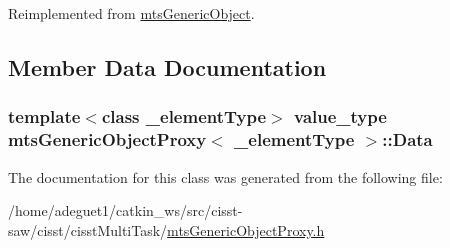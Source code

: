 Reimplemented from \hyperlink{classmts_generic_object_a4916a6c62ee5b167d7c93c88ab72523a}{mts\-Generic\-Object}.



\subsection{Member Data Documentation}
\hypertarget{classmts_generic_object_proxy_a577e49255c24db1f0573c99de275b339}{
\subsubsection[{Data}]{\setlength{\rightskip}{0pt plus 5cm}template$<$class \-\_\-element\-Type$>$ {\bf value\-\_\-type} {\bf mts\-Generic\-Object\-Proxy}$<$ \-\_\-element\-Type $>$\-::Data}}\label{classmts_generic_object_proxy_a577e49255c24db1f0573c99de275b339}


The documentation for this class was generated from the following file\-:\begin{DoxyCompactItemize}
\item 
/home/adeguet1/catkin\-\_\-ws/src/cisst-\/saw/cisst/cisst\-Multi\-Task/\hyperlink{mts_generic_object_proxy_8h}{mts\-Generic\-Object\-Proxy.\-h}\end{DoxyCompactItemize}
